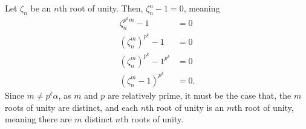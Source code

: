\documentclass[11pt]{extarticle}
\begin{document}
  Let $\zeta_n$ be an $n$th root of unity. Then, $\zeta_n^{n} - 1 = 0$, meaning
  \begin{align*}
    \zeta_n^{p^km}-1 &= 0\\
    \left(\zeta_n^{m}\right)^{p^k} - 1 &= 0\\
    \left(\zeta_n^m\right)^{p^k}- 1^{p^k} &= 0\\
    \left(\zeta_n^{m} - 1\right)^{p^k} &= 0.
  \end{align*}
  Since $m \neq p^{\ell}\alpha$, as $m$ and $p$ are relatively prime, it must be the case that, the $m$ roots of unity are distinct, and each $n$th root of unity is an $m$th root of unity, meaning there are $m$ distinct $n$th roots of unity.
\end{document}
